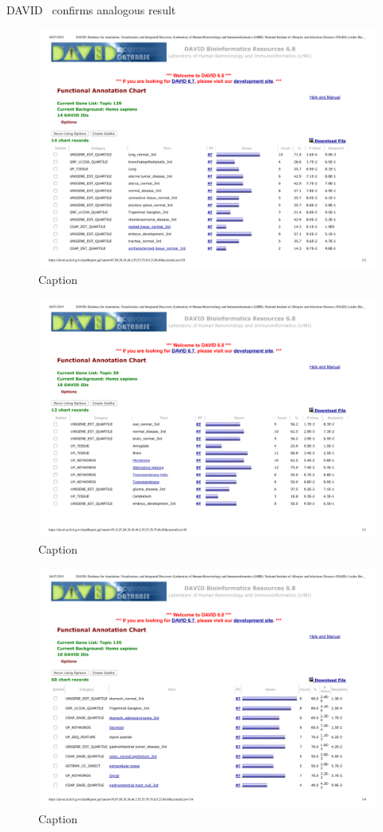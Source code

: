 DAVID~\cite{huang2008bioinformatics,huang2009systematic} confirms analogous result
\begin{figure}[htb!]
    \centering
    \includegraphics[width=0.8\linewidth]{pictures/topic/merged/DAVID_lung.pdf}
    \caption{Caption}
    \label{fig:topic/merged/DAVID_lung}
\end{figure}

\begin{figure}[htb!]
    \centering
    \includegraphics[width=0.8\linewidth]{pictures/topic/merged/DAVID_brain.pdf}
    \caption{Caption}
    \label{fig:topic/merged/DAVID_brain}
\end{figure}

\begin{figure}[htb!]
    \centering
    \includegraphics[width=0.8\linewidth]{pictures/topic/merged/DAVID_stomach.pdf}
    \caption{Caption}
    \label{fig:topic/merged/DAVID_stomach}
\end{figure}